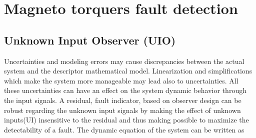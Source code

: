 \section{Magneto torquers  fault detection}
\subsection{Unknown Input Observer (UIO)}
Uncertainties and modeling errors may cause discrepancies between the actual system and the descriptor mathematical model. Linearization and simplifications which make the system more manageable may lead also to uncertainties. All these uncertainties can have an effect on the system dynamic behavior through the input signals.   
A residual, fault indicator, based on observer design can be robust regarding the unknown input signals by making the effect of unknown inputs(UI) insensitive to the residual and thus making possible to maximize the detectability of a fault. The dynamic equation of the system can be written as 
%

